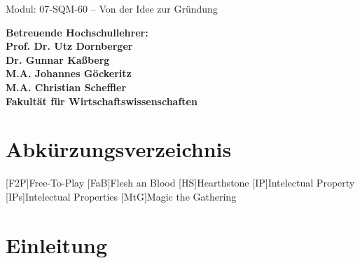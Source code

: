 \documentclass[fontsize=12, a4aper]{scrartcl}
\begin{document}

Modul: 07-SQM-60 -- Von der Idee zur Gründung

\begin{flushleft}
	
	\textbf{Betreuende Hochschullehrer:\\
			\hspace{1mm} Prof. Dr. Utz Dornberger\\
			\hspace{1mm} Dr. Gunnar Kaßberg\\
			\hspace{1mm} M.A. Johannes Göckeritz\\
			\hspace{1mm} M.A. Christian Scheffler}\\
	\textbf{Fakultät für Wirtschaftswissenschaften}\\
	
\end{flushleft}


\newpage

\tableofcontents



\newpage


\section*{Abkürzungsverzeichnis}


\begin{acronym}
	[F2P]{Free-To-Play}
	[FaB]{Flesh an Blood}
	[HS]{Hearthstone}
	[IP]{Intelectual Property}
	[IPs]{Intelectual Properties}
	[MtG]{Magic\: the Gathering}
\end{acronym}

\newpage

\setcounter{page}{3}


\section{Einleitung} \label{sec:Einleitung}
\end{document}
